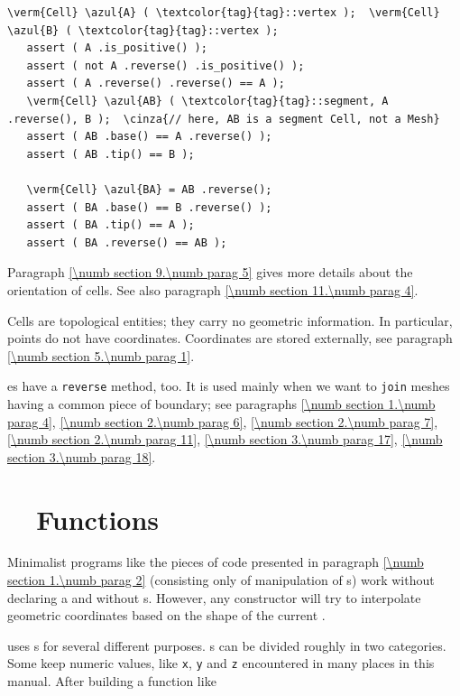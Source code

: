 \begin{Verbatim}[commandchars=\\\{\},formatcom=\small\tt,baselinestretch=0.94]
   \verm{Cell} \azul{A} ( \textcolor{tag}{tag}::vertex );  \verm{Cell} \azul{B} ( \textcolor{tag}{tag}::vertex );
   assert ( A .is_positive() );
   assert ( not A .reverse() .is_positive() );
   assert ( A .reverse() .reverse() == A );
   \verm{Cell} \azul{AB} ( \textcolor{tag}{tag}::segment, A .reverse(), B );  \cinza{// here, AB is a segment Cell, not a Mesh}
   assert ( AB .base() == A .reverse() );
   assert ( AB .tip() == B );

   \verm{Cell} \azul{BA} = AB .reverse();
   assert ( BA .base() == B .reverse() );
   assert ( BA .tip() == A );
   assert ( BA .reverse() == AB );
\end{Verbatim}

Paragraph \ref{\numb section 9.\numb parag 5} gives more details about the orientation of cells.
See also paragraph \ref{\numb section 11.\numb parag 4}.

Cells are topological entities; they carry no geometric information.
In particular, points do not have coordinates.
Coordinates are stored externally, see paragraph \ref{\numb section 5.\numb parag 1}.

{\small\tt {}}es have a {\small\tt reverse} method, too.
It is used mainly when we want to {\small\tt join} meshes having a common piece of boundary;
see paragraphs \ref{\numb section 1.\numb parag 4}, \ref{\numb section 2.\numb parag 6},
\ref{\numb section 2.\numb parag 7}, \ref{\numb section 2.\numb parag 11},
\ref{\numb section 3.\numb parag 17}, \ref{\numb section 3.\numb parag 18}.


\section{~~Functions}\label{\numb section 1.\numb parag 3}

Minimalist programs like the pieces of code presented in paragraph
\ref{\numb section 1.\numb parag 2} (consisting only of manipulation of
{\small\tt{}}s) work without declaring a {\small\tt{}}
and without {\small\tt{}}s.
However, any {\small\tt{}} constructor will try to interpolate geometric coordinates
based on the shape of the current {\small\tt{}}.

{\ManiFEM} uses {\small\tt{}}s for several different purposes.
{\small\tt{}}s can be divided roughly in two categories.
Some keep numeric values, like {\small\tt x}, {\small\tt y} and {\small\tt z}
encountered in many places in this manual.
After building a function like

